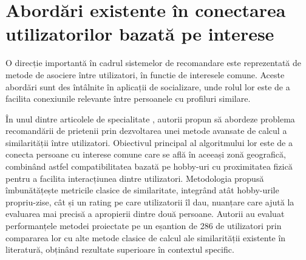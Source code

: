 \section{Abordări existente în conectarea utilizatorilor bazată pe interese}
\label{sec:ch2sec3}
O direcție importantă în cadrul sistemelor de recomandare este reprezentată de metode de asociere între utilizatori, în functie de interesele comune.
Aceste abordări sunt des întâlnite în aplicații de socializare, unde rolul lor este de a facilita conexiunile relevante între persoanele cu profiluri similare.
\par
În unul dintre articolele de specialitate \cite{tsakalakis2018improved}, autorii propun să abordeze problema recomandării de prietenii prin dezvoltarea unei metode avansate de calcul a similarității între utilizatori.
Obiectivul principal al algoritmului lor este de a conecta persoane cu interese comune care se află în aceeași zonă geografică, combinând astfel compatibilitatea bazată pe hobby-uri cu proximitatea fizică pentru a facilita interacțiunea dintre utilizatori.
Metodologia propusă îmbunătățește metricile clasice de similaritate, integrând atât hobby-urile propriu-zise, cât și un rating pe care utilizatorii îl dau, nuanțare care ajută la evaluarea mai precisă a apropierii dintre două persoane.
Autorii au evaluat performanțele metodei proiectate pe un eșantion de 286 de utilizatori prin compararea lor cu alte metode clasice de calcul ale similarității existente în literatură, obținând rezultate superioare în contextul specific.